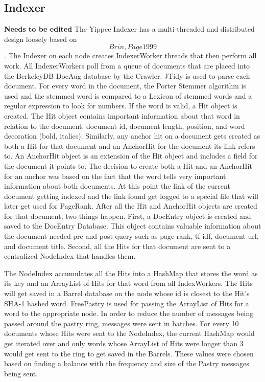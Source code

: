 \documentclass[11pt, letterpaper, oneside, twocolumn]{article}
\begin{document}
\subsection{Indexer}

\textbf{Needs to be edited}
The Yippee Indexer has a multi-threaded and distributed design loosely based on \[Brin, Page 1999\]\cite{pagerank}. The Indexer on each node creates IndexerWorker threads that then perform all work. All IndexerWorkers poll from a queue of documents that are placed into the BerkeleyDB DocAug database by the Crawler. JTidy is used to parse each document. For every word in the document, the Porter Stemmer algorithm is used and the stemmed word is compared to a Lexicon of stemmed words and a regular expression to look for numbers. If the word is valid, a Hit object is created. The Hit object contains important information about that word in relation to the document: document id, document length, position, and word decoration (bold, italics). Similarly, any anchor hit on a document gets created as both a Hit for that document and an AnchorHit for the document its link refers to. An AnchorHit object is an extension of the Hit object and includes a field for the document it points to. The decision to create both a Hit and an AnchorHit for an anchor was based on the fact that the word tells very important information about both documents. At this point the link of the current document getting indexed and the link found get logged to a special file that will later get used for PageRank. After all the Hit and AnchorHit objects are created for that document, two things happen. First, a DocEntry object is created and saved to the DocEntry Database. This object contains valuable information about the document needed pre and post query such as page rank, tf-idf, document url, and document title. Second, all the Hits for that document are sent to a centralized NodeIndex that handles them.

The NodeIndex accumulates all the Hits into a HashMap that stores the word as its key and an ArrayList of Hits for that word from all IndexWorkers. The Hits will get saved in a Barrel database on the node whose id is closest to the Hit’s SHA-1 hashed word. FreePastry is used for passing the ArrayList of Hits for a word to the appropriate node. In order to reduce the number of messages being passed around the pastry ring, messages were sent in batches. For every 10 documents whose Hits were sent to the NodeIndex, the current HashMap would get iterated over and only words whose ArrayList of Hits were longer than 3 would get sent to the ring to get saved in the Barrels. These values were chosen based on finding a balance with the frequency and size of the Pastry messages being sent. 
\end{document}
